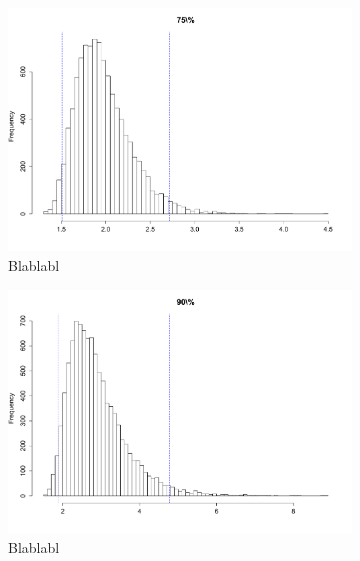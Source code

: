 \documentclass{article}
\renewcommand*{\(}{\left(}
\renewcommand*{\)}{\right)}
\begin{document}
\begin{figure}[H]
    \centering
    \begin{subfigure}[b]{0.3\textwidth}
        \includegraphics[width = \linewidth]{img/BootstrapAHill-75-30.pdf}
        \caption{Blablabl}
        \label{fig:BAH75} %
    \end{subfigure}%
    \begin{subfigure}[b]{0.3\textwidth}
        \includegraphics[width = \linewidth]{img/BootstrapAHill-90-30.pdf}
        \caption{Blablabl}
        \label{fig:BAH90}
    \end{subfigure}%
    \begin{subfigure}[b]{0.3\textwidth}

\end{subfigure}
\end{figure}
\end{document}
